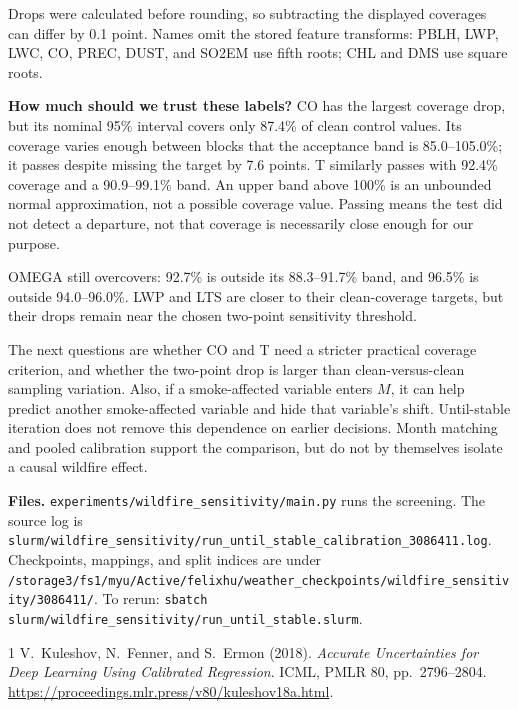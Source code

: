 \documentclass[11pt]{article}
\begin{document}
\smallskip
Drops were calculated before rounding, so subtracting the displayed coverages
can differ by 0.1 point. Names omit the stored feature transforms: PBLH, LWP,
LWC, CO, PREC, DUST, and SO2EM use fifth roots; CHL and DMS use square roots.

\textbf{How much should we trust these labels?}
CO has the largest coverage drop, but its nominal 95\% interval covers only
87.4\% of clean control values. Its coverage varies enough between blocks that
the acceptance band is 85.0--105.0\%; it passes despite missing the target by
7.6 points. T similarly passes with 92.4\% coverage and a 90.9--99.1\% band.
An upper band above 100\% is an unbounded normal approximation, not a possible
coverage value. Passing means the test did not detect a departure, not that
coverage is necessarily close enough for our purpose.

OMEGA still overcovers: 92.7\% is outside its 88.3--91.7\% band, and 96.5\% is
outside 94.0--96.0\%. LWP and LTS are closer to their clean-coverage targets,
but their drops remain near the chosen two-point sensitivity threshold.

The next questions are whether CO and T need a stricter practical coverage
criterion, and whether the two-point drop is larger than clean-versus-clean
sampling variation. Also, if a smoke-affected variable enters $M$, it can help
predict another smoke-affected variable and hide that variable's shift.
Until-stable iteration does not remove this dependence on earlier decisions.
Month matching and pooled calibration support the comparison, but do not by
themselves isolate a causal wildfire effect.

\textbf{Files.}
\texttt{experiments/wildfire\_sensitivity/main.py} runs the screening.
The source log is
\nolinkurl{slurm/wildfire_sensitivity/run_until_stable_calibration_3086411.log}.
Checkpoints, mappings, and split indices are under\\
{\footnotesize\nolinkurl{/storage3/fs1/myu/Active/felixhu/weather_checkpoints/wildfire_sensitivity/3086411/}}.
To rerun: \texttt{sbatch slurm/wildfire\_sensitivity/run\_until\_stable.slurm}.

\begin{thebibliography}{1}
\small
{}
V.~Kuleshov, N.~Fenner, and S.~Ermon (2018).
\emph{Accurate Uncertainties for Deep Learning Using Calibrated Regression}.
ICML, PMLR 80, pp.~2796--2804.
\url{https://proceedings.mlr.press/v80/kuleshov18a.html}.
\end{thebibliography}
\end{document}
